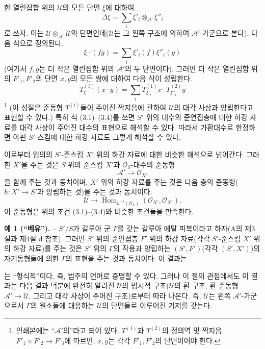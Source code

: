 \documentclass[11pt,twoside,openany]{book}
\numberwithin{equation}{section}
\newcommand{\sourceunit}{front}
\newcommand{\src}[1]{%
  \phantomsection\hypertarget{src:\sourceunit:#1}{}%
  \marginpar{\raggedleft\footnotesize\sffamily #1}%
}
\theoremstyle{plain}
\theoremstyle{definition}
\theoremstyle{remark}
\begin{document}
한 열린집합 위의 $\mathcal U$의 모든 단면 $\xi$에 대하여
\[
  \Delta\xi=\sum_i\xi'_i\otimes_{\mathcal A'}\xi''_i
\]
로 쓰자. 이는 $\mathcal U\otimes_{\mathcal A'}\mathcal U$의
단면인데($\mathcal U$는 그 왼쪽 구조에 의하여 $\mathcal A'$-가군으로
본다), 다음 식으로 정의된다.
\[
  \xi\mathbin{\cdot}(fg)=\sum_i\xi'_i(f)\xi''_i(g)
\]
(여기서 $f,g$는 더 작은 열린집합 위의 $\mathcal A'$의 두 단면이다).
그러면 더 작은 열린집합 위의 $F'_1,F'_2$의 단면 $x,y$의 모든
쌍에 대하여 다음 식이 성립한다.
\begin{equation}
  T^{(3)}_\xi(x\mathbin{\cdot}y)
  =\sum_iT^{(1)}_{\xi'_i}x\mathbin{\cdot}T^{(2)}_{\xi''_i}y
  \tag{3.4}
\end{equation}
\footnote{인쇄본에는 “$\mathcal A'$의”라고 되어 있다.
$T^{(1)}$과 $T^{(2)}$의 정의역 및 짝지음
$F'_1\times F'_2\longrightarrow F'_3$에 따르면, $x,y$는 각각
$F'_1,F'_2$의 단면이어야 한다.} (이 성질은 준동형 $T^{(i)}$들이
주어진 짝지음에 관하여 $\mathcal U$의 대각 사상과 양립한다고
표현할 수 있다.) 특히 식 (3.1)--(3.4)를 쓰면 $S'$ 위의 대수의
준연접층에 대한 하강 자료를 대각 사상이 주어진 대수의 표현으로
해석할 수 있다. 따라서 가환대수로 한정하면 아핀 $S'$-스킴에 대한
하강 자료도 그렇게 해석할 수 있다.

이로부터 임의의 $S'$-준스킴 $X'$ 위의 하강 자료에 대한 비슷한
해석으로 넘어간다. 그러한 $X'$을 주는 것은 $S$ 위의 준스킴
$X'$과 $\mathcal O_S$-대수의 준동형
\[
  \mathcal A'\longrightarrow\mathcal O_{X'}
\]
을 함께 주는 것과 동치이며, $X'$ 위의 하강 자료를 주는 것은
다음 층의 준동형($h:X'\longrightarrow S'$과 양립하는 것)을
주는 것과 동치이다.
\[
  \mathcal U\longrightarrow
  \operatorname{Hom}_{h^{-1}(\mathcal O_S)}
  (\mathcal O_{X'},\mathcal O_{X'}).
\]
이 준동형은 위의 조건 (3.1)--(3.4)와 비슷한 조건들을 만족한다.

\textbf{예 1 (“베유”).} -- $S'/S$가 갈루아 군 $\Gamma$를 갖는
갈루아 에탈 피복이라고 하자(A의 제3절과 제4절 d 참조). 그러면
$S'$ 위의 준연접층 $F'$ 위의 하강 자료(각각 $S'$-준스킴 $X'$ 위의
하강 자료)를 주는 것은 $S'$ 위의 $\Gamma$의 작용과 양립하는
$(S',F')$(각각 $(S',X')$)의 자기동형들에 의한 $\Gamma$의 표현을
주는 것과 동치이다. 이 결과는

\src{321}
는 “형식적”이다. 즉, 범주의 언어로 증명할 수 있다. 그러나 이 절의
관점에서도 이 결과는 다음 결과 덕분에 완전히 알려진 $\mathcal U$의 명시적
구조($\mathcal U$의 환 구조, 환 준동형
$\mathcal A'\longrightarrow\mathcal U$, 그리고 대각 사상이 주어진 구조)로부터
따라 나온다. 즉, $\mathcal U$는 왼쪽 $\mathcal A'$-가군으로서
$\Gamma$의 원소들에 대응하는 $\mathcal U$의 단면들로 이루어진 기저를 갖는다.
\end{document}
